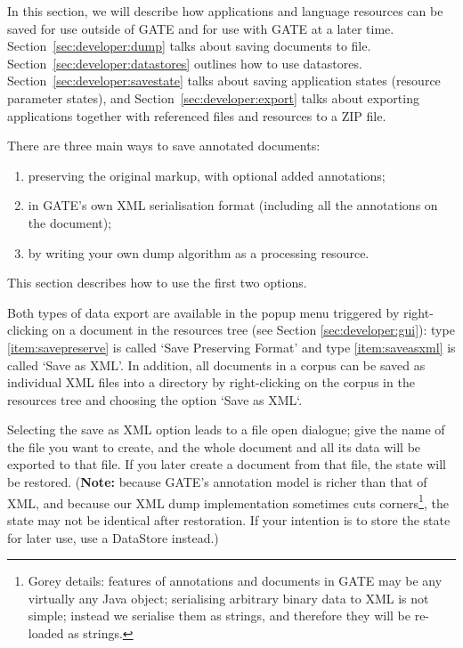 In this section, we will describe how applications and language resources can
be saved for use outside of GATE and for use with GATE at a later time.
Section~\ref{sec:developer:dump} talks about saving documents to file.
Section~\ref{sec:developer:datastores} outlines how to use datastores.
Section~\ref{sec:developer:savestate} talks about saving application states
(resource parameter states), and Section~\ref{sec:developer:export} talks about 
exporting applications together with referenced files and resources to a ZIP file.


There are three main ways to save annotated documents:

\begin{enumerate}
\item\label{item:savepreserve}
preserving the original markup, with optional added annotations;
\item\label{item:saveasxml}
in GATE's own XML serialisation format (including all the annotations on the
document);
\item
by writing your own dump algorithm as a processing resource.
\end{enumerate}

This section describes how to use the first two options.

Both types of data export are available in the popup menu triggered by
right-clicking on a document in the resources tree
(see Section \ref{sec:developer:gui}):
type \ref{item:savepreserve}
is called `Save Preserving Format' and type \ref{item:saveasxml}
is called `Save as XML'. In addition, all documents in a corpus
can be saved as individual XML files into a directory by 
right-clicking on the corpus in the resources tree and choosing
the option `Save as XML`.

Selecting the save as XML option leads to a file open dialogue; give the name
of the file you want to create, and the whole document and all its data will
be exported to that file. If you later create a document from that file, the
state will be restored. ({\bf Note:} because GATE's annotation model is
richer than that of XML, and because our XML dump implementation sometimes
cuts corners\footnote{Gorey details: features of annotations and documents
in GATE may be any virtually any Java object; serialising arbitrary binary
data to XML is not simple; instead we serialise them as strings, and
therefore they will be re-loaded as strings.}, the state may not be identical
after restoration. If your
intention is to store the state for later use, use a DataStore instead.)

